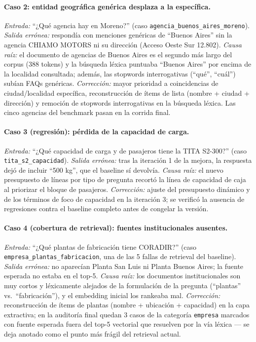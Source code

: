 \documentclass[11pt,a4paper]{article}
\newcommand{\code}[1]{\texttt{#1}}
\begin{document}
\paragraph{Caso 2: entidad geográfica genérica desplaza a la específica.}
\emph{Entrada:} ``¿Qué agencia hay en Moreno?'' (caso
\code{agencia\_buenos\_aires\_moreno}). \emph{Salida errónea:} respondía con
menciones genéricas de ``Buenos Aires'' sin la agencia CHIAMO MOTORS ni su
dirección (Acceso Oeste Sur 12.802). \emph{Causa raíz:} el documento de
agencias de Buenos Aires es el segundo más largo del corpus (388 tokens) y
la búsqueda léxica puntuaba ``Buenos Aires'' por encima de la localidad
consultada; además, las stopwords interrogativas (``qué'', ``cuál'') subían
FAQs genéricas. \emph{Corrección:} mayor prioridad a coincidencias de
ciudad/localidad específica, reconstrucción de ítems de lista (nombre +
ciudad + dirección) y remoción de stopwords interrogativas en la búsqueda
léxica. Las cinco agencias del benchmark pasan en la corrida final.

\paragraph{Caso 3 (regresión): pérdida de la capacidad de carga.}
\emph{Entrada:} ``¿Qué capacidad de carga y de pasajeros tiene la TITA
S2-300?'' (caso \code{tita\_s2\_capacidad}). \emph{Salida errónea:} tras la
iteración 1 de la mejora, la respuesta dejó de incluir ``500 kg'', que el
baseline sí devolvía. \emph{Causa raíz:} el nuevo presupuesto de líneas por
tipo de pregunta recortó la línea de capacidad de caja al priorizar el bloque
de pasajeros. \emph{Corrección:} ajuste del presupuesto dinámico y de los
términos de foco de capacidad en la iteración 3; se verificó la ausencia de
regresiones contra el baseline completo antes de congelar la versión.

\paragraph{Caso 4 (cobertura de retrieval): fuentes institucionales ausentes.}
\emph{Entrada:} ``¿Qué plantas de fabricación tiene CORADIR?'' (caso
\code{empresa\_plantas\_fabricacion}, una de las 5 fallas de retrieval del
baseline). \emph{Salida errónea:} no aparecían Planta San Luis ni Planta
Buenos Aires; la fuente esperada no estaba en el top-5. \emph{Causa raíz:}
los documentos institucionales son muy cortos y léxicamente alejados de la
formulación de la pregunta (``plantas'' vs.\ ``fabricación''), y el embedding
inicial los rankeaba mal. \emph{Corrección:} reconstrucción de ítems de
plantas (nombre + ubicación + capacidad) en la capa extractiva; en la
auditoría final quedan 3 casos de la categoría \code{empresa} marcados con
fuente esperada fuera del top-5 vectorial que resuelven por la vía léxica ---
se deja anotado como el punto más frágil del retrieval actual.
\end{document}
